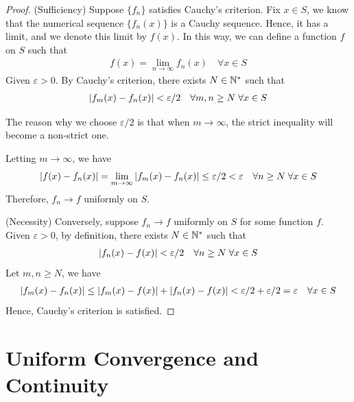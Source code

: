 \documentclass[thmcnt=section, 12pt]{my-elegantbook}
\begin{document}
\begin{proof}
    (Sufficiency) Suppose $\{f_n\}$ satisfies Cauchy's criterion. Fix $x \in S$, we know that the numerical sequence $\{f_n(x)\}$ is a Cauchy sequence. Hence, it has a limit, and we denote this limit by $f(x)$. In this way, we can define a function $f$ on $S$ such that 
    \begin{align*}
        f(x) = \lim_{n \to \infty} f_n(x)
        \quad \forall x \in S
    \end{align*}
    Given $\varepsilon > 0$. By Cauchy's criterion, there exists $N \in \mathbb{N}^\ast$ such that 
    \begin{align*}
        \left\lvert f_m(x) - f_n(x) \right\rvert < \varepsilon / 2
        \quad \forall m, n \geq N \;
        \forall x \in S
    \end{align*}
    \begin{note}
        The reason why we choose $\varepsilon / 2$ is that when $m \to \infty$, the strict inequality will become a non-strict one.
    \end{note}
    Letting $m \to \infty$, we have
    \begin{align*}
        \left\lvert f(x) - f_n(x) \right\rvert
        = \lim_{m \to \infty} \left\lvert f_m(x) - f_n(x) \right\rvert \leq \varepsilon / 2
        < \varepsilon
        \quad \forall n \geq N \;
        \forall x \in S
    \end{align*}
    Therefore, $f_n \to f$ uniformly on $S$.

    (Necessity) Conversely, suppose $f_n \to f$ uniformly on $S$ for some function $f$. Given $\varepsilon > 0$, by definition, there exists $N \in \mathbb{N}^\ast$ such that 
    \begin{align*}
        \left\lvert f_n(x) - f(x) \right\rvert < \varepsilon / 2
        \quad \forall n \geq N \; 
        \forall x \in S
    \end{align*}
    Let $m, n \geq N$, we have 
    \begin{align*}
        \left\lvert f_m(x) - f_n(x) \right\rvert
        \leq \left\lvert f_m(x) - f(x) \right\rvert
        + \left\lvert f_n(x) - f(x) \right\rvert
        < \varepsilon / 2 + \varepsilon / 2
        = \varepsilon
        \quad \forall x \in S
    \end{align*}
    Hence, Cauchy's criterion is satisfied.
\end{proof}


\section{Uniform Convergence and Continuity}
\end{document}
